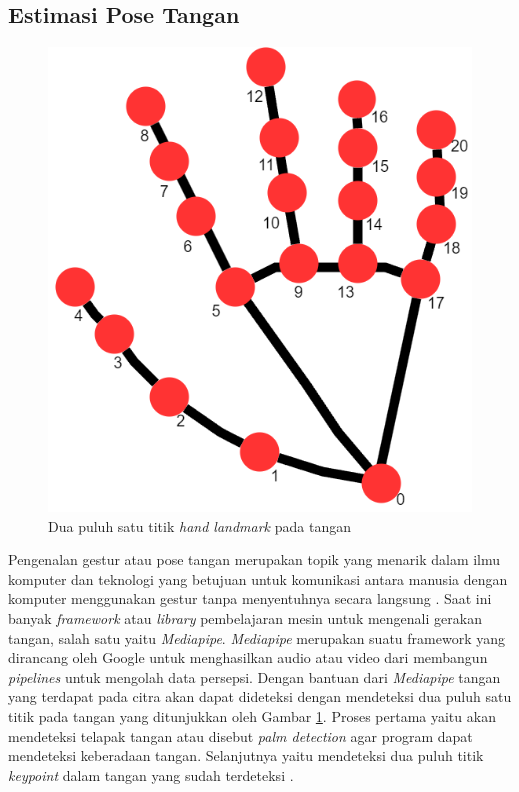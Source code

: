 \subsection{Estimasi Pose Tangan}
\begin{figure}[!h]
  \centering
	\includegraphics[width=0.5\linewidth]{../Gambar/Handlandmark.png}
	\caption{Dua puluh satu titik \textit{hand landmark} pada tangan}
	\label{fig:tangan}
\end{figure}
Pengenalan gestur atau pose tangan merupakan topik yang menarik dalam ilmu komputer dan teknologi yang betujuan untuk komunikasi antara manusia dengan komputer menggunakan gestur tanpa menyentuhnya secara langsung \parencite{UniversitasDinamika}. Saat ini banyak \textit{framework} atau \textit{library} pembelajaran mesin untuk mengenali gerakan tangan, salah satu yaitu \textit{Mediapipe}. \textit{Mediapipe} merupakan suatu framework yang dirancang oleh Google untuk menghasilkan audio atau video dari membangun \textit{pipelines} untuk mengolah data persepsi. Dengan bantuan dari \textit{Mediapipe} tangan yang terdapat pada citra akan dapat dideteksi dengan mendeteksi dua puluh satu titik pada tangan yang ditunjukkan oleh Gambar \ref*{fig:tangan}. Proses pertama yaitu akan mendeteksi telapak tangan atau disebut \textit{palm detection} agar program dapat mendeteksi keberadaan tangan. Selanjutnya yaitu mendeteksi dua puluh titik \textit{keypoint} dalam tangan yang sudah terdeteksi \parencite{mediapipejurnal}. 


